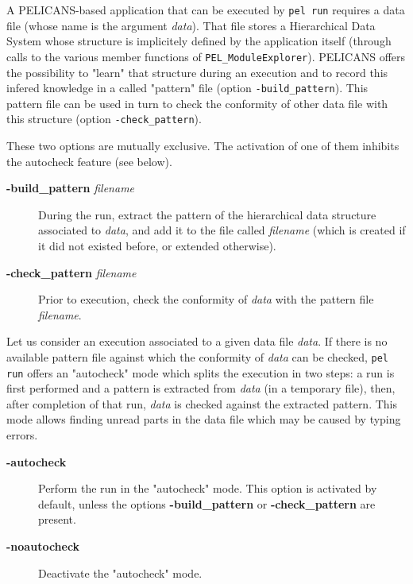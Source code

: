 \documentclass{article}
\begin{document}
A PELICANS-based application that can be executed by \texttt{pel run}
requires a data file (whose name is the argument \emph{data}).
That file stores a Hierarchical Data System whose structure
is implicitely defined by the application itself (through
calls to the various member functions of \texttt{PEL\_ModuleExplorer}).
PELICANS offers the possibility to "learn" that structure
during an execution and to record this infered knowledge
in a called "pattern" file (option \texttt{-build\_pattern}).
This pattern file can be used in turn to check
the conformity of other data file with this structure
(option \texttt{-check\_pattern}).



These two options are mutually exclusive. The activation of
one of them inhibits the autocheck feature (see below).

\begin{description}

\item[\textbf{-build\_pattern} \emph{filename}] \mbox{}

During the run, extract the pattern of the hierarchical
data structure associated to \emph{data}, and add it to the
file called \emph{filename}
(which is created if it did not existed before, or extended otherwise).


\item[\textbf{-check\_pattern} \emph{filename}] \mbox{}

Prior to execution, check the conformity of \emph{data}
with the pattern file \emph{filename}.

\end{description}


Let us consider an execution associated to a given data file \emph{data}. If
there is no available pattern file against which the conformity
of \emph{data} can be checked, \texttt{pel run} offers an "autocheck"
mode which splits the execution in two steps: a run is first performed
and a pattern is extracted from \emph{data} (in a temporary file), then, after
completion of that run, \emph{data} is checked against the extracted
pattern. This mode allows finding unread parts in the data
file which may be caused by typing errors.

\begin{description}

\item[\textbf{-autocheck}] \mbox{}

Perform the run in the "autocheck" mode. This option is activated by default,
unless the options \textbf{-build\_pattern} or \textbf{-check\_pattern} are present.


\item[\textbf{-noautocheck}] \mbox{}

Deactivate the "autocheck" mode.

\end{description}
\end{document}
